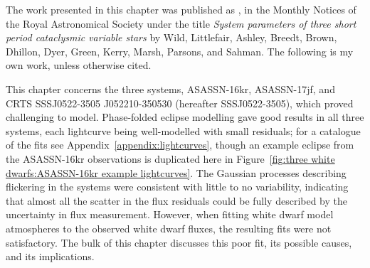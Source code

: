 \label{chpt:results:three peculiar white dwarfs} %


The work presented in this chapter was published as \cite{wild2021}, in the Monthly Notices of the Royal Astronomical Society under the title \textit{System parameters of three short period cataclysmic variable stars} by Wild, Littlefair, Ashley, Breedt, Brown, Dhillon, Dyer, Green, Kerry, Marsh, Parsons, and Sahman.
The following is my own work, unless otherwise cited.

This chapter concerns the three systems, ASASSN-16kr, ASASSN-17jf, and CRTS SSSJ0522-3505 J052210-350530 (hereafter SSSJ0522-3505), which proved challenging to model.
Phase-folded eclipse modelling gave good results in all three systems, each lightcurve being well-modelled with small residuals; for a catalogue of the fits see Appendix~\ref{appendix:lightcurves}, though an example eclipse from the ASASSN-16kr observations is duplicated here in Figure~\ref{fig:three white dwarfs:ASASSN-16kr example lightcurves}.
The Gaussian processes describing flickering in the systems were consistent with little to no variability, indicating that almost all the scatter in the flux residuals could be fully described by the uncertainty in flux measurement.
However, when fitting white dwarf model atmospheres to the observed white dwarf fluxes, the resulting fits were not satisfactory. The bulk of this chapter discusses this poor fit, its possible causes, and its implications.


